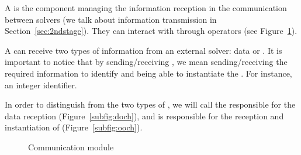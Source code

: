 
A \opch{} is the component managing the information reception in the communication between solvers (we talk about information transmission in Section~\ref{sec:2ndstage}). They can interact with \oms{} through operators (see Figure~\ref{fig:och}).

A \opch{} can receive two types of information from an external solver: data or \oms{}. It is important to notice that by sending/receiving \oms, we mean sending/receiving the required information to identify and being able to instantiate the \om. For instance, an integer identifier.

In order to distinguish from the two types of \opchs, we will call \INTROdopch{} the \opch{} responsible for the data reception (Figure~\ref{subfig:doch}), and \INTROoopch{} is responsible for the reception and instantiation of \oms{} (Figure~\ref{subfig:ooch}).


%

\begin{figure}
	\centering
	\hspace{0.05\textwidth}%
	\caption[]{Communication module}
	\label{fig:och}
\end{figure}

